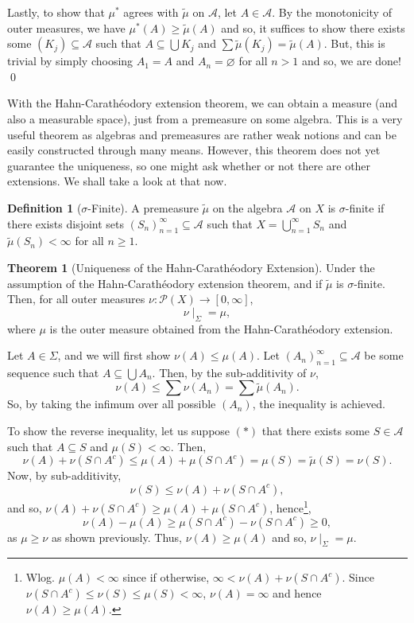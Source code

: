 \documentclass[
]{article}
\theoremstyle{definition}
\newtheorem{theorem}{Theorem}
\theoremstyle{definition}
\newtheorem{definition}{Definition}[section]
\begin{document}
Lastly, to show that \(\mu^*\) agrees with \(\tilde{\mu}\) on
\(\mathcal{A}\), let \(A \in \mathcal{A}\). By the monotonicity of outer
measures, we have \(\mu^*(A) \ge \tilde{\mu}(A)\) and so, it suffices to
show there exists some \((K_j) \subseteq \mathcal{A}\) such that
\(A \subseteq \bigcup K_j\) and
\(\sum \tilde{\mu}(K_j) = \tilde{\mu}(A)\). But, this is trivial by
simply choosing \(A_1 = A\) and \(A_n = \varnothing\) for all \(n > 1\)
and so, we are done! \qed

With the Hahn-Carathéodory extension theorem, we can obtain a measure
(and also a measurable space), just from a premeasure on some algebra.
This is a very useful theorem as algebras and premeasures are rather
weak notions and can be easily constructed through many means. However,
this theorem does not yet guarantee the uniqueness, so one might ask
whether or not there are other extensions. We shall take a look at that
now.

\begin{definition}[\(\sigma\)-Finite]
  A premeasure \(\tilde{\mu}\) on the algebra \(\mathcal{A}\) on \(X\) is \(\sigma\)-finite 
  if there exists disjoint sets \((S_n)_{n = 1}^\infty \subseteq \mathcal{A}\) such 
  that \(X = \bigcup_{n = 1}^\infty S_n\) and \(\tilde{\mu}(S_n) < \infty\) for all 
  \(n \ge 1\). 
\end{definition}

\begin{theorem}[Uniqueness of the Hahn-Carathéodory Extension]
  Under the assumption of the Hahn-Carathéodory extension theorem, and if 
  \(\tilde{\mu}\) is \(\sigma\)-finite. Then, for all outer measures 
  \(\nu : \mathcal{P}(X) \to [0, \infty]\), 
  \[\nu\mid_\Sigma = \mu,\]
  where \(\mu\) is the outer measure obtained from the Hahn-Carathéodory extension.
\end{theorem}
\proof

Let \(A \in \Sigma\), and we will first show \(\nu(A) \le \mu(A)\). Let
\((A_n)_{n = 1}^\infty \subseteq \mathcal{A}\) be some sequence such
that \(A \subseteq \bigcup A_n\). Then, by the sub-additivity of
\(\nu\), \[\nu(A) \le \sum \nu(A_n) = \sum \tilde{\mu}(A_n).\] So, by
taking the infimum over all possible \((A_n)\), the inequality is
achieved.

To show the reverse inequality, let us suppose \((*)\) that there exists
some \(S \in \mathcal{A}\) such that \(A \subseteq S\) and
\(\mu(S) < \infty\). Then,
\[\nu(A) + \nu(S \cap A^c) \le \mu(A) + \mu(S \cap A^c) = \mu(S) = \tilde{\mu}(S) = \nu(S).\]
Now, by sub-additivity, \[\nu(S) \le \nu(A) + \nu(S \cap A^c),\] and so,
\(\nu(A) + \nu(S \cap A^c) \ge \mu(A) + \mu(S \cap A^c)\),
hence\footnote{
    Wlog. \(\mu(A) < \infty\) since if otherwise, \(\infty < \nu(A) + \nu(S \cap A^c)\). 
    Since \(\nu(S \cap A^c) \le \nu(S) \le \mu(S) < \infty\), \(\nu(A) = \infty\) 
    and hence \(\nu(A) \ge \mu(A)\).},
\[\nu(A) - \mu(A) \ge \mu(S \cap A^c) - \nu(S \cap A^c) \ge 0,\] as
\(\mu \ge \nu\) as shown previously. Thus, \(\nu(A) \ge \mu(A)\) and so,
\(\nu\mid_\Sigma = \mu\).
\end{document}
